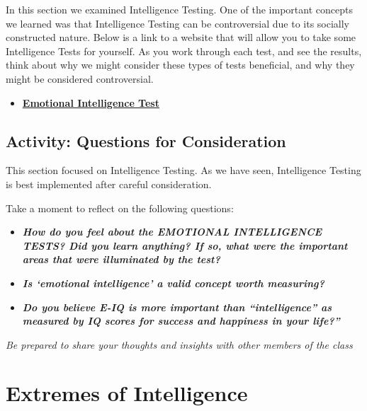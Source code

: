 \documentclass[
]{book}
\providecommand{\tightlist}{%
  \setlength{\itemsep}{0pt}\setlength{\parskip}{0pt}}
\begin{document}
\begin{reflect}
In this section we examined Intelligence Testing. One of the important concepts we learned was that Intelligence Testing can be controversial due to its socially constructed nature.
Below is a link to a website that will allow you to take some Intelligence Tests for yourself. As you work through each test, and see the results, think about why we might consider these types of tests beneficial, and why they might be considered controversial.

\begin{itemize}
\tightlist
\item
  \href{https://www.queendom.com/tests/}{\textbf{Emotional Intelligence Test}}
\end{itemize}
\end{reflect}

\hypertarget{activity-questions-for-consideration}{%
\subsection*{Activity: Questions for Consideration}\label{activity-questions-for-consideration}}

\begin{reflect}
This section focused on Intelligence Testing. As we have seen, Intelligence Testing is best implemented after careful consideration.

Take a moment to reflect on the following questions:

\begin{itemize}
\tightlist
\item
  \textbf{\emph{How do you feel about the EMOTIONAL INTELLIGENCE TESTS? Did you learn anything? If so, what were the important areas that were illuminated by the test?}}
\item
  \textbf{\emph{Is `emotional intelligence' a valid concept worth measuring?}}
\item
  \textbf{\emph{Do you believe E-IQ is more important than ``intelligence'' as measured by IQ scores for success and happiness in your life?''}}
\end{itemize}

\emph{Be prepared to share your thoughts and insights with other members of the class}
\end{reflect}

\hypertarget{extremes-of-intelligence}{%
\section{Extremes of Intelligence}\label{extremes-of-intelligence}}
\end{document}
